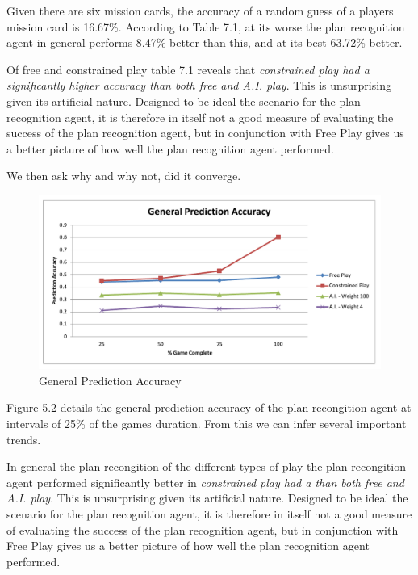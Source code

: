 \documentclass[parskip]{cs4rep}
\begin{document}
Given there are six mission cards, the accuracy of a random guess of a players mission card is 16.67\%. According to Table 7.1, at its worse the plan recognition agent in general performs 8.47\% better than this, and at its best 63.72\% better. 

Of free and constrained play table 7.1 reveals that \textit{constrained play had a significantly higher accuracy than both free and A.I. play}. This is unsurprising given its artificial nature. Designed to be ideal the scenario for the plan recognition agent, it is therefore in itself not a good measure of evaluating the success of the plan recognition agent, but in conjunction with Free Play gives us a better picture of how well the plan recognition agent performed.

We then ask why and why not, did it converge.

\begin{figure}[h]
\centerline{
\includegraphics[width=\textwidth]{images/general-graph.pdf}
}
\caption{General Prediction Accuracy}
\label{fig:dom-debug-gui}
\end{figure} 

Figure 5.2 details the general prediction accuracy of the plan recongition agent at intervals of 25\% of the games duration. From this we can infer several important trends.

In general the plan recongition of the different types of play the plan recongition agent performed significantly better in \textit{constrained play had a than both free and A.I. play}. This is unsurprising given its artificial nature. Designed to be ideal the scenario for the plan recognition agent, it is therefore in itself not a good measure of evaluating the success of the plan recognition agent, but in conjunction with Free Play gives us a better picture of how well the plan recognition agent performed.
\end{document}
